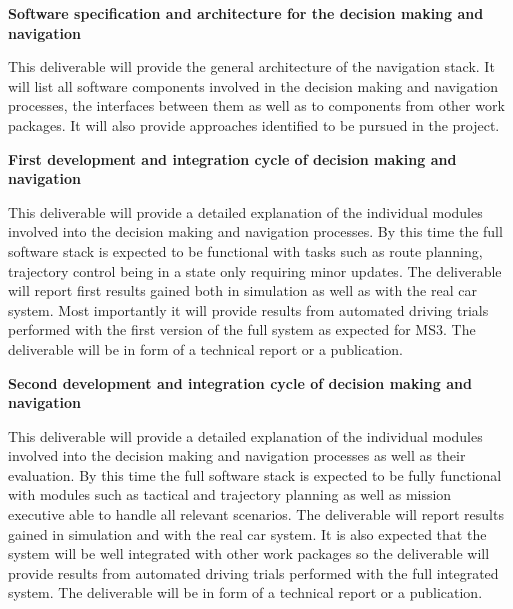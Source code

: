 {\begin{tasks}{\WPNavigationNo}
\end{tasks}


\begin{deliverables}{\WPNavigationNo}

\item {\bf Software specification and architecture for the decision making and navigation} 

This deliverable will provide the general architecture of the navigation stack. It will list all software components involved in the decision making and navigation processes, the interfaces between them as well as to components from other work packages. It will also provide approaches identified to be pursued in the project.

\item {\bf First development and integration cycle of decision making and navigation} 

This deliverable will provide a detailed explanation of the individual modules involved into the decision making and navigation processes. By this time the full software stack is expected to be functional with tasks such as route planning, trajectory control being in a state only requiring minor updates.
The deliverable will report first results gained both in simulation as well as with the real car system. Most importantly it will provide results from automated driving trials performed with the first version of the full system as expected for MS3.
The deliverable will be in form of a technical report or a publication.

\item {\bf Second development and integration cycle of decision making and navigation} 

This deliverable will provide a detailed explanation of the individual modules involved into the decision making and navigation processes as well as their evaluation. By this time the full software stack is expected to be fully functional with modules such as tactical and trajectory planning as well as mission executive able to handle all relevant scenarios.
The deliverable will report results gained in simulation and with the real car system. It is also expected that the system will be well integrated with other work packages so the deliverable will provide results from automated driving trials performed with the full integrated system. The deliverable will be in form of a technical report or a publication.


\end{deliverables}}
